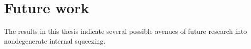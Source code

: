 \section{Future work}
\label{sec:future_work}


The results in this thesis indicate several possible avenues of future research into nondegenerate internal squeezing. %


